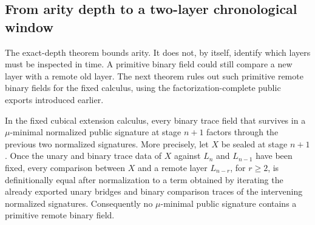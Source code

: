 \subsection{From arity depth to a two-layer chronological window}
\label{subsec:recent-history}

The exact-depth theorem bounds arity.  It does not, by itself, identify which layers must be
inspected in time.  A primitive binary field could still compare a new layer with a remote
old layer.  The next theorem rules out such primitive remote binary fields for the fixed
calculus, using the factorization-complete public exports introduced earlier.

\begin{theorem}
\label{thm:recent-history-factorization}
In the fixed cubical extension calculus, every binary trace field that survives in a
\(\mu\)-minimal normalized public signature at stage \(n+1\) factors through the previous two
normalized signatures.  More precisely, let \(X\) be sealed at stage \(n+1\).  Once the unary
and binary trace data of \(X\) against \(L_n\) and \(L_{n-1}\) have been fixed, every
comparison between \(X\) and a remote layer \(L_{n-r}\), for \(r\geq 2\), is
definitionally equal after normalization to a term obtained by iterating the already exported
unary bridges and binary comparison traces of the intervening normalized signatures.
Consequently no \(\mu\)-minimal public signature contains a primitive remote binary field.
\end{theorem}

